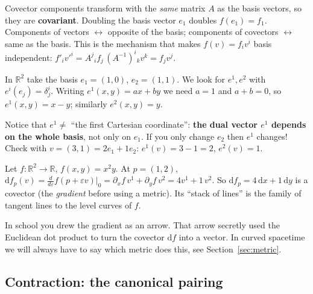 \documentclass[11pt,a4paper]{article}
\numberwithin{equation}{section}
\theoremstyle{definition}
\theoremstyle{plain}
\newcommand{\R}{\mathbb{R}}
\newcommand{\dd}{\mathrm{d}}
\begin{document}
\begin{intuition}[{covariant = changes like the basis}]
Covector components transform with the \emph{same} matrix $A$ as the basis vectors, so they are \textbf{covariant}. Doubling the basis vector $e_1$ doubles $f(e_1)=f_1$. Components of vectors $\leftrightarrow$ opposite of the basis; components of covectors $\leftrightarrow$ same as the basis. This is the mechanism that makes $f(v)=f_iv^i$ basis independent:
$f'_iv'^i=A^j{}_if_j\,(A^{-1})^i{}_kv^k=f_jv^j$.
\end{intuition}

\begin{example}
In $\R^2$ take the basis $e_1=(1,0)$, $e_2=(1,1)$. We look for $e^{1},e^{2}$ with $e^{i}(e_j)=\delta^i_j$. Writing $e^{1}(x,y)=ax+by$ we need $a=1$ and $a+b=0$, so $e^{1}(x,y)=x-y$; similarly $e^{2}(x,y)=y$.

Notice that $e^{1}\neq$ ``the first Cartesian coordinate'': \textbf{the dual vector $e^{1}$ depends on the whole basis}, not only on $e_1$. If you only change $e_2$ then $e^{1}$ changes! Check with $v=(3,1)=2e_1+1e_2$: $e^{1}(v)=3-1=2$, $e^{2}(v)=1$. \checkmark
\end{example}

\begin{example}
Let $f:\R^2\to\R$, $f(x,y)=x^2y$. At $p=(1,2)$, $\dd f_p(v)=\frac{d}{d\varepsilon}f(p+\varepsilon v)|_0=\partial_xf\,v^1+\partial_yf\,v^2=4v^1+1\,v^2$. So $\dd f_p=4\,\dd x+1\,\dd y$ is a covector (the \emph{gradient} before using a metric). Its ``stack of lines'' is the family of tangent lines to the level curves of $f$.
\end{example}

\begin{pitfall}
In school you drew the gradient as an arrow. That arrow secretly used the Euclidean dot product to turn the covector $\dd f$ into a vector. In curved spacetime we will always have to say which metric does this, see Section~\ref{sec:metric}.
\end{pitfall}



\subsection{Contraction: the canonical pairing}\label{sec:contraction}
\end{document}
